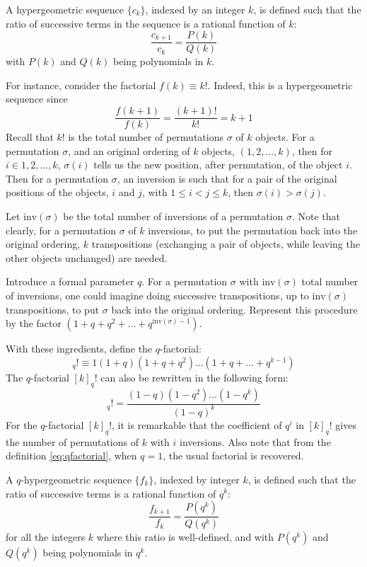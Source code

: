 \documentclass[a4paper,titlepage,twoside]{book}
\begin{document}
A hypergeometric sequence $\lbrace c_k \rbrace$, indexed by an integer $k$,  is defined such that the ratio of successive terms in the sequence is a rational function of $k$:
\[
\frac{c_{k+1}}{ c_k } = \frac{P(k)}{ Q(k)}
\]
with $P(k)$ and $Q(k)$ being polynomials in $k$. 

For instance, consider the factorial $f(k) \equiv k!$.  Indeed, this is a hypergeometric sequence since
\[
\frac{ f(k+1)}{ f(k)} = \frac{ (k+1)! }{ k!} = k+1
\]
Recall that $k!$ is the total number of permutations $\sigma$ of $k$ objects.  For a permutation $\sigma$, and an original ordering of $k$ objects, $(1,2, \dots , k)$, then for $i \in 1, 2, \dots , k$, $\sigma(i)$ tells us the new position, after permutation, of the object $i$.  Then for a permutation $\sigma$, an inversion is such that for a pair of the original positions of the objects, $i$ and $j$, with $1\leq i < j \leq k$, then $\sigma(i) > \sigma(j)$.  

Let $\text{inv}{(\sigma)}$ be the total number of inversions of a permutation $\sigma$.  Note that clearly, for a permutation $\sigma$ of $k$ inversions, to put the permutation back into the original ordering, $k$ transpositions (exchanging a pair of objects, while leaving the other objects unchanged) are needed.

Introduce a formal parameter $q$.  For a permutation $\sigma$ with $\text{inv}{(\sigma)}$ total number of inversions, one could imagine doing successive transpositions, up to $\text{inv}{(\sigma)}$ transpositions, to put $\sigma$ back into the original ordering.  Represent this procedure by the factor $(1 + q + q^2 + \dots + q^{ \text{inv}{(\sigma )} -1})$.  

With these ingredients, define the $q$-factorial:
\begin{equation}
[k]_q! \equiv 1 (1 +q)( 1 + q +q^2) \dots (1 + q + \dots + q^{k-1} )  \label{eq:qfactorial}
\end{equation}
The $q$-factorial $[k]_q!$ can also be rewritten in the following form:
\begin{equation}
[k]_q! =   \frac{ ( 1-q)(1-q^2) \dots (1-q^k ) }{ (1-q)^k}
\end{equation}
For the $q$-factorial $[k]_q!$, it is remarkable that the coefficient of $q^i$ in $[k]_q!$ gives the number of permutations of $k$ with $i$ inversions.  Also note that from the definition \eqref{eq:qfactorial}, when $q=1$, the usual factorial is recovered.  

A $q$-hypergeometric sequence $\lbrace f_k \rbrace$, indexed by integer $k$, is defined such that the ratio of successive terms is a rational function of $q^k$:
\[
\frac{f_{k+1}}{ f_k} = \frac{ P{ (q^k)} }{ Q{(q^k)}}
\]
for all the integers $k$ where this ratio is well-defined, and with $P(q^k)$ and $Q(q^k)$ being polynomials in $q^k$.  
\end{document}
